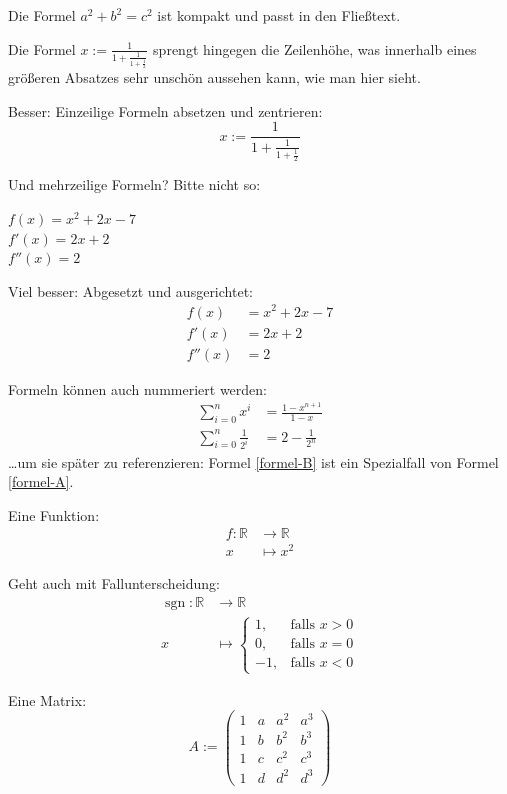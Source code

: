 Die Formel $a^2 + b^2 = c^2$ ist kompakt und passt in den Fließtext.

Die Formel $x := \frac{1}{1+\frac{1}{1+\frac{1}{2}}}$ sprengt hingegen die Zeilenhöhe, was innerhalb eines größeren Absatzes sehr unschön aussehen kann, wie man hier sieht.

Besser: Einzeilige Formeln absetzen und zentrieren:
\[
  x := \frac{1}{1+\frac{1}{1+\frac{1}{2}}}
\]

Und mehrzeilige Formeln? Bitte nicht so:

$f(x) = x^2 + 2x - 7$ \\
$f'(x) = 2x+2$ \\
$f''(x) = 2$

Viel besser: Abgesetzt und ausgerichtet:
\begin{align*}
  f(x) &= x^2 + 2x - 7 \\
  f'(x) &= 2x+2 \\
  f''(x) &= 2
\end{align*}

Formeln können auch nummeriert werden:
\begin{align}
  \sum_{i=0}^{n} x^i &= \frac{1-x^{n+1}}{1-x}       \label{formel-A} \\
  \sum_{i=0}^{n} \frac{1}{2^i} &= 2 - \frac{1}{2^n} \label{formel-B}
\end{align}
\dots um sie später zu referenzieren: Formel \eqref{formel-B} ist ein Spezialfall von Formel \eqref{formel-A}.

Eine Funktion:
\begin{align*}
  f \colon \mathbb{R} &\longrightarrow \mathbb{R} \\
  x &\longmapsto x^2
\end{align*}

Geht auch mit Fallunterscheidung:
\begin{align*}
  \operatorname{sgn} \colon \mathbb{R} &\longrightarrow \mathbb{R} \\
  x &\longmapsto \begin{cases}
    1, & \text{falls } x > 0 \\
    0, & \text{falls } x = 0 \\
    -1, & \text{falls } x < 0
  \end{cases}
\end{align*}

Eine Matrix:
\[
  A := \begin{pmatrix}
    1 & a & a^2 & a^3 \\
    1 & b & b^2 & b^3 \\
    1 & c & c^2 & c^3 \\
    1 & d & d^2 & d^3
  \end{pmatrix}
\]

